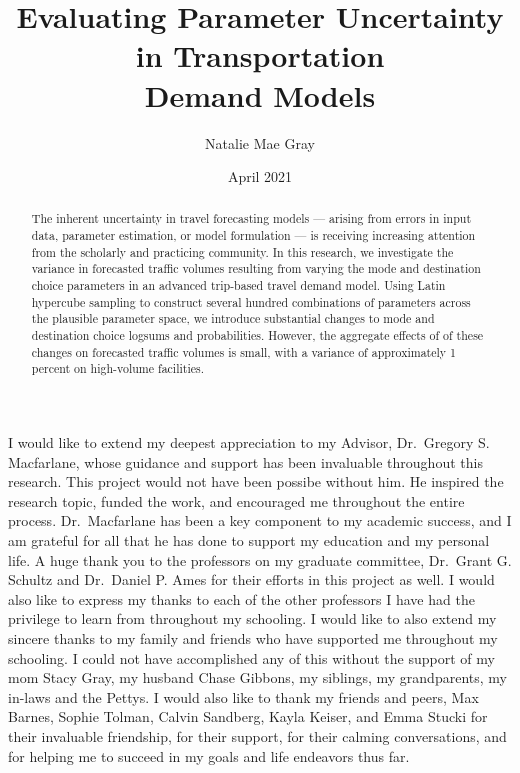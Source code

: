 \documentclass[fancy, masters,twoside]{byuthesis}
\title{Evaluating Parameter Uncertainty in Transportation\\
Demand Models}
\author{Natalie Mae Gray}
\date{April 2021}
\begin{document}
	\frontmatter

	\titlepage
	\cleardoublepage

	\customtitlepage
	\cleardoublepage


    \begin{abstract}
  The inherent uncertainty in travel forecasting models --- arising from errors in input data, parameter estimation, or model formulation --- is receiving increasing attention from the scholarly and practicing community. In this research, we investigate the variance in forecasted traffic volumes resulting from varying the mode and destination choice parameters in an advanced trip-based travel demand model. Using Latin hypercube sampling to construct several hundred combinations of parameters across the plausible parameter space, we introduce substantial changes to mode and destination choice logsums and probabilities. However, the aggregate effects of of these changes on forecasted traffic volumes is small, with a variance of approximately 1 percent on high-volume facilities.
  \end{abstract}
  	\cleardoublepage


    \begin{acknowledgments}
  I would like to extend my deepest appreciation to my Advisor, Dr.~Gregory S. Macfarlane, whose guidance and support has been invaluable throughout this research. This project would not have been possibe without him. He inspired the research topic, funded the work, and encouraged me throughout the entire process. Dr.~Macfarlane has been a key component to my academic success, and I am grateful for all that he has done to support my education and my personal life.
  A huge thank you to the professors on my graduate committee, Dr.~Grant G. Schultz and Dr.~Daniel P. Ames for their efforts in this project as well. I would also like to express my thanks to each of the other professors I have had the privilege to learn from throughout my schooling.
  I would like to also extend my sincere thanks to my family and friends who have supported me throughout my schooling. I could not have accomplished any of this without the support of my mom Stacy Gray, my husband Chase Gibbons, my siblings, my grandparents, my in-laws and the Pettys. I would also like to thank my friends and peers, Max Barnes, Sophie Tolman, Calvin Sandberg, Kayla Keiser, and Emma Stucki for their invaluable friendship, for their support, for their calming conversations, and for helping me to succeed in my goals and life endeavors thus far.
  \end{acknowledgments}
  	\cleardoublepage
\end{document}
